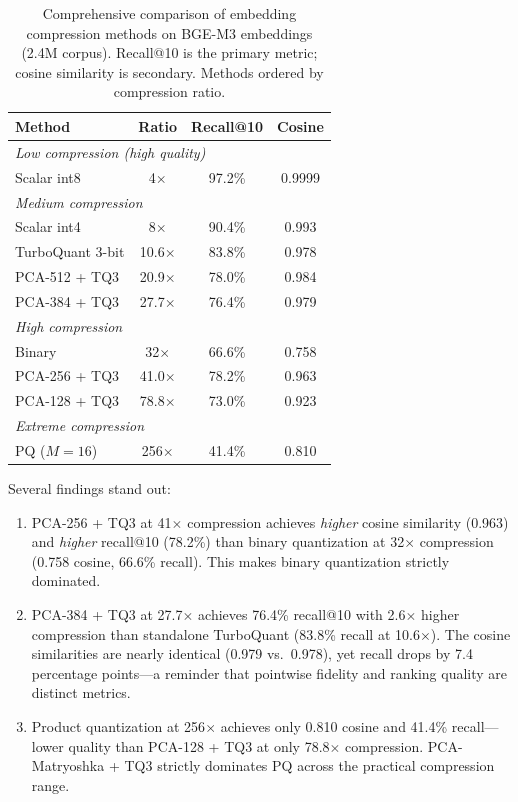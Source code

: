 \documentclass[journal]{IEEEtran}
\begin{document}
\begin{table}[t]
  \centering
  \caption{Comprehensive comparison of embedding compression methods on
  BGE-M3 embeddings (2.4M corpus). Recall@10 is the primary metric; cosine
  similarity is secondary.  Methods ordered by compression ratio.}
  \label{tab:all_methods}
  \begin{tabular}{lccc}
    \toprule
    \textbf{Method} & \textbf{Ratio} & \textbf{Recall@10} & \textbf{Cosine} \\
    \midrule
    \multicolumn{4}{l}{\textit{Low compression (high quality)}} \\
    Scalar int8         & 4$\times$     & 97.2\% & 0.9999 \\
    \midrule
    \multicolumn{4}{l}{\textit{Medium compression}} \\
    Scalar int4         & 8$\times$     & 90.4\% & 0.993  \\
    TurboQuant 3-bit    & 10.6$\times$  & 83.8\% & 0.978  \\
    PCA-512 + TQ3       & 20.9$\times$  & 78.0\% & 0.984  \\
    PCA-384 + TQ3       & 27.7$\times$  & 76.4\% & 0.979  \\
    \midrule
    \multicolumn{4}{l}{\textit{High compression}} \\
    Binary              & 32$\times$    & 66.6\% & 0.758  \\
    PCA-256 + TQ3       & 41.0$\times$  & 78.2\% & 0.963  \\
    PCA-128 + TQ3       & 78.8$\times$  & 73.0\% & 0.923  \\
    \midrule
    \multicolumn{4}{l}{\textit{Extreme compression}} \\
    PQ ($M\!=\!16$)     & 256$\times$   & 41.4\% & 0.810  \\
    \bottomrule
  \end{tabular}
\end{table}

Several findings stand out:

\begin{enumerate}
  \item PCA-256 + TQ3 at 41$\times$ compression achieves \emph{higher} cosine similarity (0.963) and \emph{higher} recall@10 (78.2\%) than binary quantization at 32$\times$ compression (0.758 cosine, 66.6\% recall).
  This makes binary quantization strictly dominated.

  \item PCA-384 + TQ3 at 27.7$\times$ achieves 76.4\% recall@10 with 2.6$\times$ higher compression than standalone TurboQuant (83.8\% recall at 10.6$\times$). The cosine similarities are nearly identical (0.979 vs.\ 0.978), yet recall drops by 7.4 percentage points---a reminder that pointwise fidelity and ranking quality are distinct metrics.

  \item Product quantization at 256$\times$ achieves only 0.810 cosine and 41.4\% recall---lower quality than PCA-128 + TQ3 at only 78.8$\times$ compression.
  PCA-Matryoshka + TQ3 strictly dominates PQ across the practical compression range.
\end{enumerate}
\end{document}
